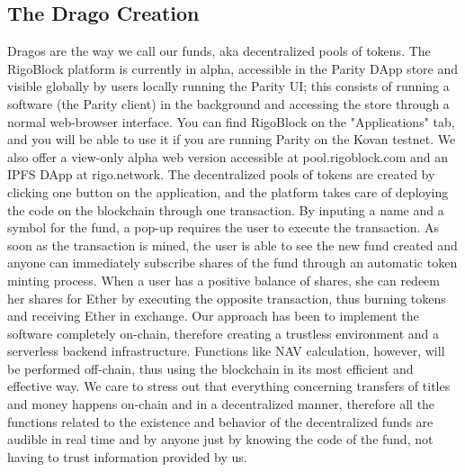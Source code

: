 \documentclass[9pt,oneside]{amsart}
\begin{document}
\begin{multicols}{2}
\subsection{The Drago Creation} \label{ch:block}
Dragos are the way we call our funds, aka decentralized pools of tokens. The RigoBlock platform is currently in alpha, accessible in the Parity DApp store and visible globally by users locally running the Parity UI; this consists of running a software (the Parity client) in the background and accessing the store through a normal web-browser interface. You can find RigoBlock on the "Applications" tab, and you will be able to use it if you are running Parity on the Kovan testnet. We also offer a view-only alpha web version accessible at pool.rigoblock.com and an IPFS DApp at rigo.network.
The decentralized pools of tokens are created by clicking one button on the application, and the platform takes care of deploying the code on the blockchain through one transaction. By inputing a name and a symbol for the fund, a pop-up requires the user to execute the transaction. As soon as the transaction is mined, the user is able to see the new fund created and anyone can immediately subscribe shares of the fund through an automatic token minting process. When a user has a positive balance of shares, she can redeem her shares for Ether by executing the opposite transaction, thus burning tokens and receiving Ether in exchange.
Our approach has been to implement the software completely on-chain, therefore creating a trustless environment and a serverless backend infrastructure. Functions like NAV calculation, however, will be performed off-chain, thus using the blockchain in its most efficient and effective way. We care to stress out that everything concerning transfers of titles and money happens on-chain and in a decentralized manner, therefore all the functions related to the existence and behavior of the decentralized funds are audible in real time and by anyone just by knowing the code of the fund, not having to trust information provided by us.


\end{multicols}
\end{document}
